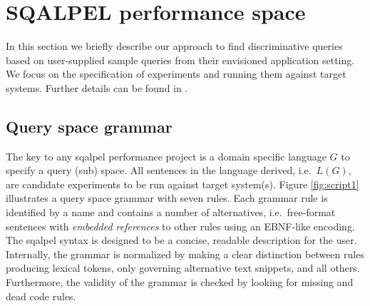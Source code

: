 \documentclass{cidr-2019}
\begin{document}
\section{SQALPEL performance space}\label{overview}

In this section we briefly describe our approach to find
discriminative queries based on user-supplied sample queries from
their envisioned application setting. We focus on the specification
of experiments and running them against target systems. Further
details can be found in \cite{DBLP:conf/sigmod/KerstenKZ18}.

\subsection{Query space grammar}\label{specification}
The key to any {\sc sqalpel} performance project is a domain specific
language $G$ to specify a query (sub) space. All sentences in the
language derived, i.e.\ $L(G)$, are candidate experiments to be run
against target system(s). Figure
\ref{fig:script1} illustrates a query space grammar with seven rules.
Each grammar rule is identified by a name and contains a number of
alternatives, i.e.\ free-format sentences with \textit{embedded
  references} to other rules using an EBNF-like encoding.
The {\sc sqalpel} syntax is designed to be a concise, readable
description for the user. Internally, the grammar is normalized by
making a clear distinction between rules producing lexical tokens,
only governing alternative text snippets, and all others.
Furthermore, the validity of the grammar is checked by looking for
missing and dead code rules.
\end{document}
